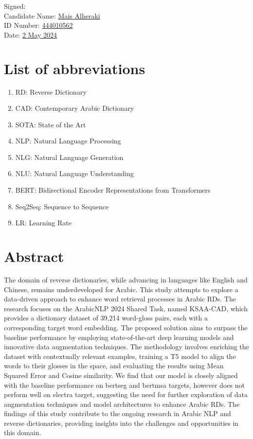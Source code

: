 \documentclass[12pt]{article}
\begin{document}
\noindent
Signed:\\
Candidate Name: \underline{Mais Alheraki}\\
ID Number: \underline{444010562}\\
Date: \underline{2 May 2024}



\newpage

\thispagestyle{empty}
\listoffigures
\newpage
\thispagestyle{empty}
\listoftables
\newpage

\section*{List of abbreviations}
\begin{enumerate}
    \item[] RD: Reverse Dictionary
    \item[] CAD: Contemporary Arabic Dictionary
    \item[] SOTA: State of the Art
    \item[] NLP: Natural Language Processing
    \item[] NLG: Natural Language Generation
    \item[] NLU: Natural Language Understanding
    \item[] BERT: Bidirectional Encoder Representations from Transformers
    \item[] Seq2Seq: Sequence to Sequence
    \item[] LR: Learning Rate
\end{enumerate}
\newpage

\section*{Abstract}

The domain of reverse dictionaries, while advancing in languages like English and Chinese, remains underdeveloped for Arabic. This study attempts to explore a data-driven approach to enhance word retrieval processes in Arabic RDs. The research focuses on the ArabicNLP 2024 Shared Task, named KSAA-CAD, which provides a dictionary dataset of 39,214 word-gloss pairs, each with a corresponding target word embedding. The proposed solution aims to surpass the baseline performance by employing state-of-the-art deep learning models and innovative data augmentation techniques. The methodology involves enriching the dataset with contextually relevant examples, training a T5 model to align the words to their glosses in the space, and evaluating the results using Mean Squared Error and Cosine similarity. We find that our model is closely aligned with the baseline performance on bertseg and bertmsa targets, however does not perform well on electra target, suggesting the need for further exploration of data augmentation techniques and model architectures to enhance Arabic RDs. The findings of this study contribute to the ongoing research in Arabic NLP and reverse dictionaries, providing insights into the challenges and opportunities in this domain.
\end{document}
